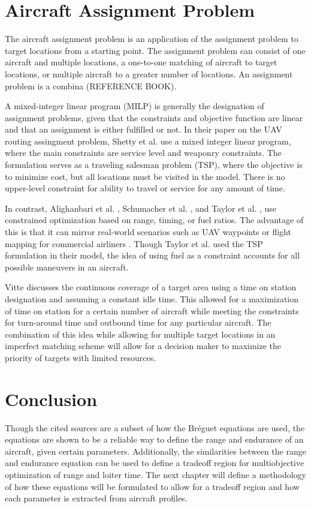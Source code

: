 \section{Aircraft Assignment Problem}
The aircraft assignment problem is an application of the assignment problem to target locations from a starting point. The assignment problem can consist of one aircraft and multiple locations, a one-to-one matching of aircraft to target locations, or multiple aircraft to a greater number of locations. An assignment problem is a combina (REFERENCE BOOK).\par
A mixed-integer linear program (MILP) is generally the designation of assignment problems, given that the constraints and objective function are linear and that an assignment is either fulfilled or not. In their paper on the UAV routing assingment problem, Shetty et al. \cite{Shetty} use a mixed integer linear program, where the main constraints are service level and weaponry constraints. The formulation serves as a traveling salesman problem (TSP), where the objective is to minimize cost, but all locations must be visited in the model. There is no upper-level constraint for ability to travel or service for any amount of time.\par
In contrast, Alighanbari et al. \cite{Alighanbari}, Schumacher et al. \cite{Schumacher}, and Taylor et al. \cite{Taylor}, use constrained optimization based on range, timing, or fuel ratios. The advantage of this is that it can mirror real-world scenarios such as UAV waypoints \cite{Alighanbari} or flight mapping for commercial airliners \cite{Taylor}. Though Taylor et al. \cite{Taylor} used the TSP formulation in their model, the idea of using fuel as a constraint accounts for all possible maneuvers in an aircraft.\par
Vitte \cite{OptimizeBreguet} discusses the continuous coverage of a target area using a time on station designation and assuming a constant idle time. This allowed for a maximization of time on station for a certain number of aircraft while meeting the constraints for turn-around time and outbound time for any particular aircraft. The combination of this idea while allowing for multiple target locations in an imperfect matching scheme will allow for a decision maker to maximize the priority of targets with limited resources.


\section{Conclusion}
Though the cited sources are a subset of how the Br\'eguet equations are used, the equations are shown to be a reliable way to define the range and endurance of an aircraft, given certain parameters. Additionally, the similarities between the range and endurance equation can be used to define a tradeoff region for multiobjective optimization of range and loiter time. The next chapter will define a methodology of how these equations will be formulated to allow for a tradeoff region and how each parameter is extracted from aircraft profiles.